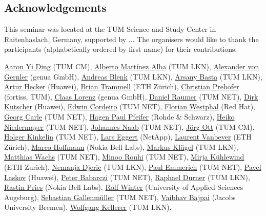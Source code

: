 \subsection*{Acknowledgements}\label{sec:acknowledgement}

This seminar was located at the TUM Science and Study Center in Raitenhaslach,
Germany, supported by ...  The organisers would like to thank the participants
(alphabetically ordered by first name) for their contributions:

\href{}{Aaron Yi Ding} (TUM CM),
\href{}{Alberto Martínez Alba} (TUM LKN),
\href{}{Alexander von Gernler} (genua GmbH),
\href{}{Andreas Blenk} (TUM LKN),
\href{}{Arsany Basta} (TUM LKN),
\href{}{Artur Hecker} (Huawei),
\href{}{Brian Trammell} (ETH Zürich),
\href{}{Christian Prehofer} (fortiss, TUM),
\href{}{Claas Lorenz} (genua GmbH),
\href{}{Daniel Raumer} (TUM NET),
\href{}{Dirk Kutscher} (Huawei),
\href{}{Edwin Cordeiro} (TUM NET),
\href{}{Florian Westphal} (Red Hat),
\href{}{Georg Carle} (TUM NET),
\href{}{Hagen Paul Pfeifer} (Rohde \& Schwarz),
\href{}{Heiko Niedermayer} (TUM NET),
\href{}{Johannes Naab} (TUM NET),
\href{}{Jörg Ott} (TUM CM),
\href{}{Holger Kinkelin} (TUM NET),
\href{}{Lars Eggert} (NetApp),
\href{}{Laurent Vanbever} (ETH Zürich),
\href{}{Marco Hoffmann} (Nokia Bell Labs),
\href{}{Markus Klügel} (TUM LKN),
\href{}{Matthias Wachs} (TUM NET),
\href{}{Minoo Rouhi} (TUM NET),
\href{}{Mirja Kühlewind} (ETH Zurich),
\href{}{Nemanja Djeric} (TUM LKN),
\href{}{Paul Emmerich} (TUM NET),
\href{}{Pavel Laskov} (Huawei),
\href{}{Peter Babarczi} (TUM NET),
\href{}{Raphael Durner} (TUM LKN),
\href{}{Rastin Pries} (Nokia Bell Labs),
\href{}{Rolf Winter} (University of Applied Sciences Augsburg),
\href{}{Sebastian Gallenmüller} (TUM NET),
\href{}{Vaibhav Bajpai} (Jacobs University Bremen),
\href{}{Wolfgang Kellerer} (TUM LKN),

\vfill\eject

